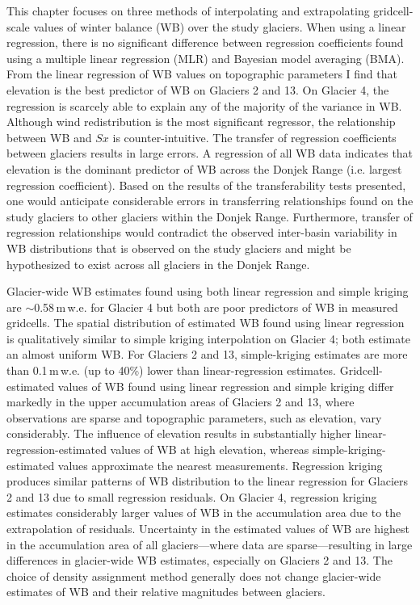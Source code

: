 \documentclass{sfuthesis}
\begin{document}
This chapter focuses on three methods of interpolating and extrapolating gridcell-scale values of winter balance (WB) over the study glaciers. When using a linear regression, there is no significant difference between regression coefficients found using a multiple linear regression (MLR) and Bayesian model averaging (BMA). From the linear regression of WB values on topographic parameters I find that elevation is the best predictor of WB on Glaciers 2 and 13. On Glacier 4, the regression is scarcely able to explain any of the majority of the variance in WB. Although wind redistribution is the most significant regressor, the relationship between WB and $Sx$ is counter-intuitive. The transfer of regression coefficients between glaciers results in large errors. A regression of all WB data indicates that elevation is the dominant predictor of WB across the Donjek Range (i.e. largest regression coefficient). Based on the results of the transferability tests presented, one would anticipate considerable errors in transferring relationships found on the study glaciers to other glaciers within the Donjek Range. Furthermore, transfer of regression relationships would contradict the observed inter-basin variability in WB distributions that is observed on the study glaciers and might be hypothesized to exist across all glaciers in the Donjek Range. 

Glacier-wide WB estimates found using both linear regression and simple kriging are $\sim$0.58\,m\,w.e. for Glacier 4 but both are poor predictors of WB in measured gridcells. The spatial distribution of estimated WB found using linear regression is qualitatively similar to simple kriging interpolation on Glacier 4; both estimate an almost uniform WB. For Glaciers 2 and 13, simple-kriging estimates are more than 0.1\,m\,w.e. (up to 40\%) lower than linear-regression estimates. Gridcell-estimated values of WB found using linear regression and simple kriging differ markedly in the upper accumulation areas of Glaciers 2 and 13, where observations are sparse and topographic parameters, such as elevation, vary considerably. The influence of elevation results in substantially higher linear-regression-estimated values of WB at high elevation, whereas simple-kriging-estimated values approximate the nearest measurements. Regression kriging produces similar patterns of WB distribution to the linear regression for Glaciers 2 and 13 due to small regression residuals. On Glacier 4, regression kriging estimates considerably larger values of WB in the accumulation area due to the extrapolation of residuals. Uncertainty in the estimated values of WB are highest in the accumulation area of all glaciers---where data are sparse---resulting in large differences in glacier-wide WB estimates, especially on Glaciers 2 and 13. The choice of density assignment method generally does not change glacier-wide estimates of WB and their relative magnitudes between glaciers.
\end{document}

